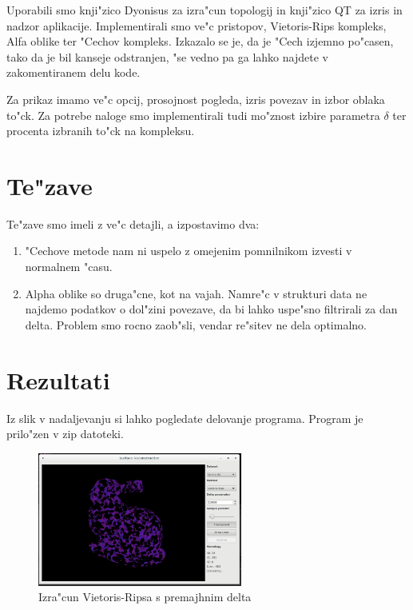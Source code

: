 \documentclass[11pt]{article}
\begin{document}
Uporabili smo knji"zico Dyonisus za izra"cun topologij in knji"zico QT za izris in nadzor aplikacije. Implementirali smo ve"c pristopov, Vietoris-Rips kompleks, Alfa oblike ter "Cechov kompleks. Izkazalo se je, da je "Cech izjemno po"casen, tako da je bil kanseje odstranjen, "se vedno pa ga lahko najdete v zakomentiranem delu kode.

Za prikaz imamo ve"c opcij, prosojnost pogleda, izris povezav in izbor oblaka to"ck. Za potrebe naloge smo implementirali tudi mo"znost izbire parametra $\delta$ ter procenta izbranih to"ck na kompleksu.

\section{Te"zave}

Te"zave smo imeli z ve"c detajli, a izpostavimo dva:

\begin{enumerate}
\item "Cechove metode nam ni uspelo z omejenim pomnilnikom izvesti v normalnem "casu.
\item Alpha oblike so druga"cne, kot na vajah. Namre"c v strukturi data ne najdemo podatkov o dol"zini povezave, da bi lahko uspe"sno filtrirali za dan delta. Problem smo rocno zaob"sli, vendar re"sitev ne dela optimalno.
\end{enumerate}

\section{Rezultati}

Iz slik v nadaljevanju si lahko pogledate delovanje programa. Program je prilo"zen v zip datoteki.

\begin{figure}[htb]
    \centering
    \includegraphics[width=0.6\textwidth]{vr_long.png}
    \caption{Izra"cun Vietoris-Ripsa s premajhnim delta}
    \label{fig:vr1}
\end{figure}
\end{document}
